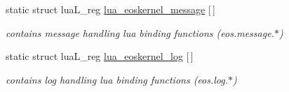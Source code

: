 \begin{CompactItemize}
static struct luaL\_\-reg \hyperlink{structEOSKernel_7033fb8fd34a75b851d9d9958e38c8f1}{lua\_\-eoskernel\_\-message} \mbox{[}$\,$\mbox{]}
\begin{CompactList}\small\item\em contains message handling lua binding functions (eos.message.$\ast$) \item\end{CompactList}\item 
static struct luaL\_\-reg \hyperlink{structEOSKernel_ed8c742384718b2e595d4f800178f80a}{lua\_\-eoskernel\_\-log} \mbox{[}$\,$\mbox{]}
\begin{CompactList}\small\item\em contains log handling lua binding functions (eos.log.$\ast$) \item\end{CompactList}\end{CompactItemize}
